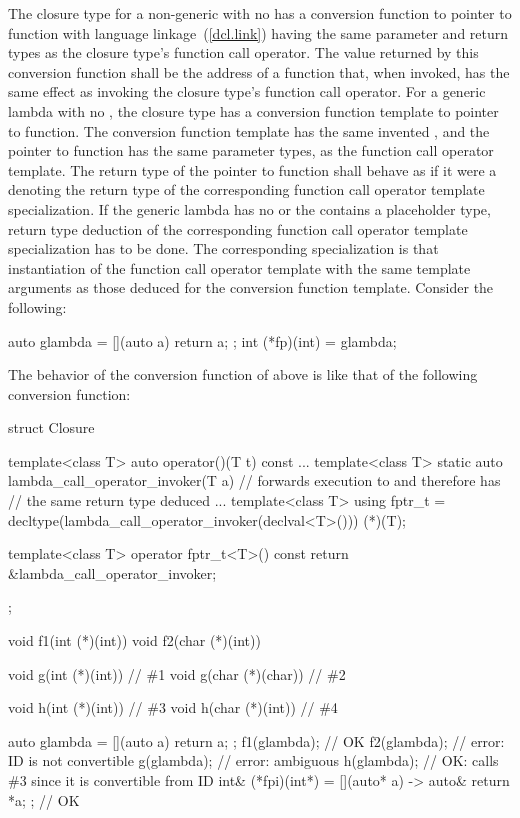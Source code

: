 \pnum
The closure type for a non-generic  with no
has a conversion function to pointer to
function with \Cpp language linkage~(\ref{dcl.link}) having
the same parameter and return types as the closure type's function call operator. The
value returned by this conversion function shall be the address of a function that, when
invoked, has the same effect as invoking the closure type's function call operator.
For a generic lambda with no , the closure type has a
conversion function template to
pointer to function. The conversion function template has the same invented
, and the pointer to function has the same
parameter types, as the function call operator template.  The return type of
the pointer to function shall behave as if it were a
 denoting the return type of the corresponding
function call operator template specialization.
\enternote If the generic lambda has no  or
the  contains a placeholder type, return type
deduction of the corresponding function call operator template specialization
has to be done. The corresponding specialization is that instantiation of the
function call operator template with the same template arguments as those
deduced for the conversion function template.  Consider the following:
\begin{codeblock}
auto glambda = [](auto a) { return a; };
int (*fp)(int) = glambda;
\end{codeblock}
The behavior of the conversion function of  above is like
that of the following conversion function:
\begin{codeblock}
struct Closure {
  template<class T> auto operator()(T t) const { ... }
  template<class T> static auto lambda_call_operator_invoker(T a) {
    // forwards execution to  and therefore has
    // the same return type deduced
    ...
  }
  template<class T> using fptr_t =
     decltype(lambda_call_operator_invoker(declval<T>())) (*)(T);

  template<class T> operator fptr_t<T>() const
    { return &lambda_call_operator_invoker; }
};
\end{codeblock}
\exitnote
\enterexample
\begin{codeblock}
void f1(int (*)(int))   { }
void f2(char (*)(int))  { }

void g(int (*)(int))    { }  // \#1
void g(char (*)(char))  { }  // \#2

void h(int (*)(int))    { }  // \#3
void h(char (*)(int))   { }  // \#4

auto glambda = [](auto a) { return a; };
f1(glambda);  // OK
f2(glambda);  // error: ID is not convertible
g(glambda);   // error: ambiguous
h(glambda);   // OK: calls \#3 since it is convertible from ID
int& (*fpi)(int*) = [](auto* a) -> auto& { return *a; }; // OK
\end{codeblock}
